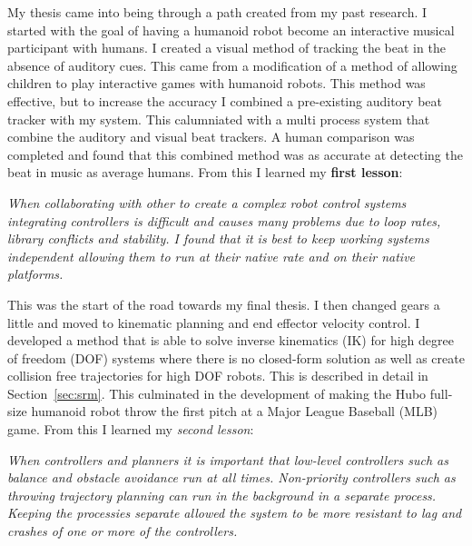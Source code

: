 My thesis came into being through a path created from my past research.
I started with the goal of having a humanoid robot become an interactive musical participant with humans.
I created a visual method of tracking the beat in the absence of auditory cues\cite{5686847}.
This came from a modification of a method of allowing children to play interactive games with humanoid robots\cite{lofaroGamesRobot}.
This method was effective, but to increase the accuracy I combined a pre-existing auditory beat tracker with my system.
This calumniated with a multi process system that combine the auditory and visual beat trackers\cite{lofaroIASTED2011,6094987,lofaroEURASIP2011}.
A human comparison was completed and found that this combined method was as accurate at detecting the beat in music as average humans.
From this I learned my \textbf{first lesson}:
\begin{adjustwidth}{2cm}{} \small
\noindent \textit{When collaborating with other to create a complex robot control systems integrating controllers is difficult and causes many problems due to loop rates, library conflicts and stability.
I found that it is best to keep working systems independent allowing them to run at their native rate and on their native platforms.}
\end{adjustwidth} \normalsize
\noindent This was the start of the road towards my final thesis.
I then changed gears a little and moved to kinematic planning and end effector velocity control. 
I developed a method that is able to solve inverse kinematics (IK) for high degree of freedom (DOF) systems where there is no closed-form solution as well as create collision free trajectories for high DOF robots\cite{6385987}.
This is described in detail in Section~\ref{sec:srm}.
This culminated in the development of making the Hubo full-size humanoid robot throw the first pitch at a Major League Baseball (MLB) game\cite{lofaroHumanoids2012,6462956}.
From this I learned my \textit{second lesson}:
\begin{adjustwidth}{2cm}{} \small
\noindent \textit{When controllers and planners it is important that low-level controllers such as balance and obstacle avoidance run at all times. 
Non-priority controllers such as throwing trajectory planning can run in the background in a separate process.
Keeping the processies separate allowed the system to be more resistant to lag and crashes of one or more of the controllers. }
\end{adjustwidth} \normalsize
